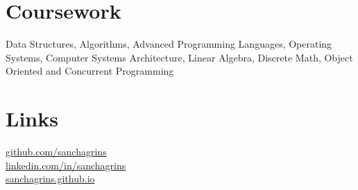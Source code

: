 \documentclass[]{sanchagrins-resume}
\begin{document}
\begin{minipage}[t]{0.33\textwidth}

\section{Coursework} 
Data Structures, Algorithms, Advanced Programming Languages,
Operating Systems, Computer Systems Architecture,
Linear Algebra, Discrete Math, Object Oriented and Concurrent Programming 

\sectionsep




\section{Links} 
{\href{https://github.com/sancahgrins}{\faGithub \hspace{2mm}github.com/sanchagrins}}\\
{\href{https://www.linkedin.com/in/sanchagrins}{\faLinkedinSquare \hspace{2mm}linkedin.com/in/sanchagrins}}\\
{\href{https://sanchagrins.github.io}{\faGlobe \hspace{2mm}sanchagrins.github.io}}


\sectionsep

%
%

\end{minipage} 
\hfill
\end{document}
